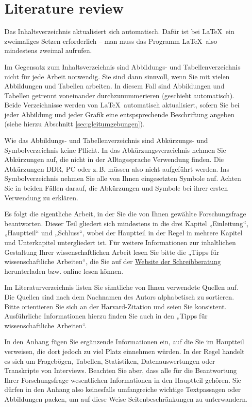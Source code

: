\documentclass{scrbook}
\begin{document}
\section{Literature review}
Das Inhaltsverzeichnis aktualisiert sich automatisch. Dafür ist bei \LaTeX\ ein zweimaliges Setzen erforderlich – man muss das Programm \LaTeX\ also mindestens zweimal aufrufen.

Im Gegensatz zum Inhaltsverzeichnis sind  Abbildungs- und Tabellenverzeichnis nicht für jede Arbeit notwendig. Sie sind dann sinnvoll, wenn Sie mit vielen Abbildungen und Tabellen arbeiten. In diesem Fall sind Abbildungen und Tabellen getrennt voneinander durchzunummerieren (geschieht automatisch). Beide Verzeichnisse werden von \LaTeX\ automatisch aktualisiert, sofern Sie bei jeder Abbildung und jeder Grafik eine entspsprechende Beschriftung angeben (siehe hierzu Abschnitt \ref{sec:gleitumgebungen}).

Wie das Abbildungs- und Tabellenverzeichnis sind Abkürzungs- und Symbolverzeichnis keine Pflicht. In das Abkürzungsverzeichnis nehmen Sie Abkürzungen auf, die nicht in der Alltagssprache Verwendung finden. Die Abkürzungen DDR, PC oder z.\,B. müssen also nicht aufgeführt werden. Ins Symbolverzeichnis nehmen Sie alle von Ihnen eingesetzten Symbole auf. Achten Sie in beiden Fällen darauf, die Abkürzungen und Symbole bei ihrer ersten Verwendung zu erklären. 


Es folgt die eigentliche Arbeit, in der Sie die von Ihnen gewählte Forschungs\-frage beantworten. Dieser Teil gliedert sich mindestens in die drei Kapitel „Einleitung“, „Hauptteil“ und „Schluss“, wobei der Hauptteil in der Regel in mehrere Kapitel und Unterkapitel untergliedert ist. Für weitere Informationen zur inhaltlichen Gestaltung Ihrer wissenschaftlichen Arbeit lesen Sie bitte die „Tipps für wissenschaftliche Arbeiten“, die Sie auf der \href{https://www.vwl.uni-mannheim.de/studium/bachelorstudium/schreibberatung/weiterfuehrendes-material-und-vorlagen/}{\color{blue} Website der Schreibberatung} herunterladen bzw. online lesen können.

Im Literaturverzeichnis listen Sie sämtliche von Ihnen verwendete Quellen auf. Die Quellen sind nach dem Nachnamen des Autors alphabetisch zu sortieren. Bitte orientieren Sie sich an der Harvard-Zitation und seien Sie konsistent. Ausführliche Informationen hierzu finden Sie auch in den „Tipps für wissenschaftliche Arbeiten“.

In den Anhang fügen Sie ergänzende Informationen ein, auf die Sie im Hauptteil verweisen, die dort jedoch zu viel Platz einnehmen würden. In der Regel handelt es sich um Fragebögen, Tabellen, Statistiken, Datenauswertungen oder Transkripte von Interviews. Beachten Sie aber, dass alle für die Beantwortung Ihrer Forschungsfrage wesentlichen Informationen in den Hauptteil gehören. Sie dürfen in den Anhang also keinesfalls umfangreiche wichtige Textpassagen oder Abbildungen packen, um auf diese Weise Seitenbeschränkungen zu unterwandern.
\end{document}
